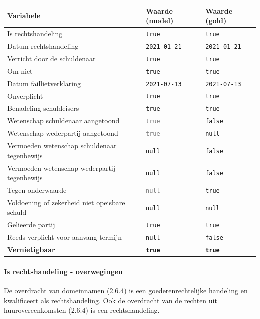 \documentclass[
  dutch,
  a4paper,
]{article}
\begin{document}
\begin{center}
\small
\begin{tabular}{@{}p{7.4cm}p{2.6cm}p{2.6cm}@{}}
\toprule
Variabele & Waarde (model) & Waarde (gold) \\
\midrule
Is rechtshandeling & \texttt{true} & \texttt{true} \\
Datum rechtshandeling & \texttt{2021-01-21} & \texttt{2021-01-21} \\
Verricht door de schuldenaar & \texttt{true} & \texttt{true} \\
Om niet & \texttt{true} & \texttt{true} \\
Datum faillietverklaring & \texttt{2021-07-13} & \texttt{2021-07-13} \\
Onverplicht & \texttt{true} & \texttt{true} \\
Benadeling schuldeisers & \texttt{true} & \texttt{true} \\
Wetenschap schuldenaar aangetoond & \textcolor{gray}{\texttt{true}} & \texttt{false} \\
Wetenschap wederpartij aangetoond & \textcolor{gray}{\texttt{true}} & \texttt{null} \\
Vermoeden wetenschap schuldenaar tegenbewijs & \texttt{null} & \texttt{false} \\
Vermoeden wetenschap wederpartij tegenbewijs & \texttt{null} & \texttt{false} \\
Tegen onderwaarde & \textcolor{gray}{\texttt{null}} & \texttt{true} \\
Voldoening of zekerheid niet opeisbare schuld & \texttt{null} & \texttt{null} \\
Gelieerde partij & \texttt{true} & \texttt{true} \\
Reeds verplicht voor aanvang termijn & \texttt{null} & \texttt{false} \\
\textbf{Vernietigbaar} & \textbf{\texttt{true}} & \textbf{\texttt{true}} \\
\bottomrule
\end{tabular}
\end{center}

\paragraph{Is rechtshandeling - overwegingen}\label{is-rechtshandeling---overwegingen-21}

De overdracht van domeinnamen (2.6.4) is een goederenrechtelijke handeling en kwalificeert als rechtshandeling. Ook de overdracht van de rechten uit huurovereenkomsten (2.6.4) is een rechtshandeling.
\end{document}
